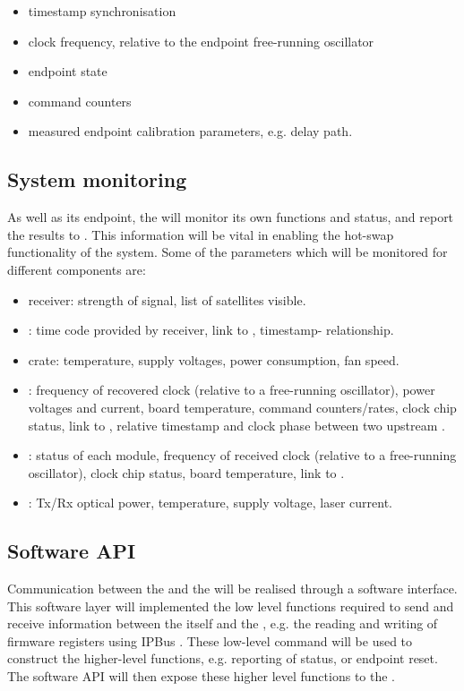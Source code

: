 \documentclass{dune}
\begin{document}
\begin{itemize}
  \item timestamp synchronisation
  \item clock frequency, relative to the endpoint free-running oscillator
  \item endpoint state
  \item command counters
  \item measured endpoint calibration parameters, e.g. delay path.
\end{itemize}

\subsection{System monitoring}
As well as its endpoint, the  will monitor its own functions and status, and report the results to . This information will be vital in enabling the hot-swap functionality of the system. Some of the parameters which will be monitored for different  components are:

\begin{itemize}
    \item {} receiver: strength of signal, list of satellites visible. 
    \item {}: time code provided by  receiver, link to ,  timestamp- relationship.
    \item {} crate: temperature, supply voltages, power consumption, fan speed.
    \item {}: frequency of recovered clock (relative to a free-running oscillator), power voltages and current, board temperature, command counters/rates, clock chip status, link to , relative timestamp and clock phase between two upstream  .
    \item {}: status of each  module, frequency of received clock (relative to a free-running oscillator), clock chip status, board temperature, link to .
    \item {}: Tx/Rx optical power, temperature, supply voltage, laser current.  
\end{itemize}

\subsection{Software API}
Communication between the  and the  will be realised through a software interface. This software layer will implemented the low level functions required to send and receive information between the itself and the , e.g. the reading and writing of  firmware registers using IPBus \cite{ipbus}. These low-level command will be used to construct the higher-level functions, e.g. reporting of  status, or endpoint reset. The software API will then expose these higher level functions to the .
\end{document}
